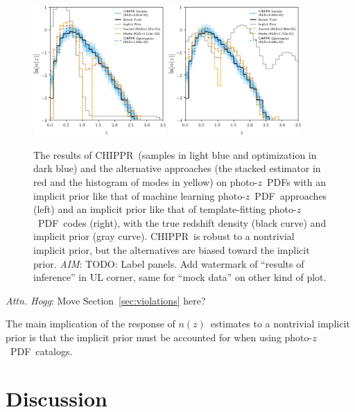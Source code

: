 \documentclass[iop]{emulateapj}
\newcommand{\todo}[3]{{\color{#2}\emph{#1}: #3}}
\newcommand{\aim}[1]{\todo{AIM}{red}{#1}}
\newcommand{\dwh}[1]{\todo{Attn. Hogg}{blue}{#1}}
\newcommand{\Sect}[1]{Section~\ref{#1}}
\newcommand{\project}[1]{\textsc{#1}}
\newcommand{\Chippr}{\project{CHIPPR}}%
\newcommand{\pz}{photo-$z$}
\newcommand{\pzpdf}{\pz\ PDF}%
\newcommand{\nz}{$n(z)$}
\begin{document}
\begin{figure}
	\begin{center}
	\includegraphics[width=0.45\textwidth]{figures/chippr/results_trpr.png}
	\includegraphics[width=0.45\textwidth]{figures/chippr/results_tmpr.png}
	\caption{
		The results of \Chippr\ (samples in light blue and optimization in dark blue) and the alternative approaches (the stacked estimator in red and the histogram of modes in yellow) on \pzpdf s with an implicit prior like that of machine learning \pzpdf\ approaches (left) and an implicit prior like that of template-fitting \pzpdf\ codes (right), with the true redshift density (black curve) and implicit prior (gray curve).
		\Chippr\ is robust to a nontrivial implicit prior, but the alternatives are biased toward the implicit prior.
		\aim{TODO: Label panels.
		Add watermark of ``results of inference'' in UL corner, same for ``mock data'' on other kind of plot.}
	}
	\label{fig:results-priors}
	\end{center}
\end{figure}

\dwh{Move \Sect{sec:violations} here?}

The main implication of the response of \nz\ estimates to a nontrivial implicit prior is that the implicit prior must be accounted for when using \pzpdf\ catalogs.

\section{Discussion}
\label{sec:results}
\end{document}
